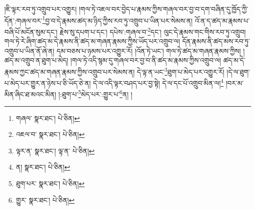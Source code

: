 །ཇི་ལྟར་རབ་ཏུ་འགྲུབ་པར་འགྱུར། །གལ་ཏེ་འཇལ་བར་བྱེད་པ་རྣམས་ཀྱིས་གཞལ་བར་བྱ་བ་དག་བཞིན་དུ་ཁྱོད་ཀྱི་དོན་:གཞལ་བར་\footnote{གཞལ་  སྣར་ཐང་།  པེ་ཅིན། }བྱ་བ་དེ་རྣམས་ཚད་མ་ཉིད་ཀྱིས་རབ་ཏུ་འགྲུབ་པ་ཡིན་པར་སེམས་ན། འོ་ན་ད་ཚད་མ་རྣམས་པ་བཞི་པོ་མངོན་སུམ་དང་། རྗེས་སུ་དཔག་པ་དང་། དཔེས་:གཞལ་བ་\footnote{འཇལ་བ་  སྣར་ཐང་།  པེ་ཅིན། }དང་། ལུང་དེ་རྣམས་གང་གིས་རབ་ཏུ་འགྲུབ། གལ་ཏེ་རེ་ཞིག་ཚད་མ་དེ་རྣམས་ནི་ཚད་མ་གཞན་རྣམས་ཀྱིས་ཡོད་པར་འགྲུབ་ལ། དོན་རྣམས་ནི་ཚད་མས་རབ་ཏུ་འགྲུབ་པ་ཡིན་ནོ་ཞེ་ན། དམ་བཅས་པ་ཉམས་པར་འགྱུར་རོ། །འོན་ཏེ་ཡང་། གལ་ཏེ་ཚད་མ་གཞན་རྣམས་ཀྱིས། །ཚད་མ་འགྲུབ་ན་ཐུག་པ་མེད། །གལ་ཏེ་འདི་སྙམ་དུ་གཞལ་བར་བྱ་བ་ནི་ཚད་མ་རྣམས་ཀྱིས་འགྲུབ་ལ། ཚད་མ་དེ་རྣམས་ཀྱང་ཚད་མ་གཞན་རྣམས་ཀྱིས་འགྲུབ་པར་སེམས་ན། དེ་ལྟ་ན་ཡང་\footnote{ལྟར་ན་  སྣར་ཐང་། ལྟ་ན་  པེ་ཅིན། }ཐུག་པ་མེད་པར་འགྱུར་རོ། །དེ་ལ་ཐུག་པ་མེད་པར་གྱུར་ན་ཉེས་པ་ཅི་ཡོད་ཅེ་ན། དེ་ལ་འདི་ལྟར་བཤད་པར་བྱ་སྟེ། དེ་ལ་དང་པོ་འགྲུབ་མིན་ལ།\footnote{ན།  སྣར་ཐང་།  པེ་ཅིན། } །བར་མ་མིན་ཞིང་ཐ་མའང་མིན། །:ཐུག་པ་\footnote{ཐུག་པར་  སྣར་ཐང་།  པེ་ཅིན། }མེད་པར་:གྱུར་པ་\footnote{གྱུར་  སྣར་ཐང་།  པེ་ཅིན། }ན། །
